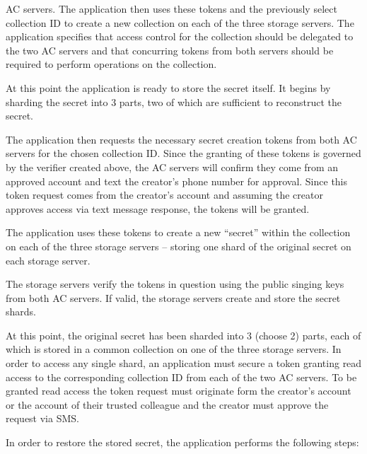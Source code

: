 \begin{packed_enum}
{    AC servers}. The application then uses these tokens and the
  previously select collection ID to create a new collection on each
  of the three storage servers. The application specifies that access
  control for the collection should be delegated to the two AC servers
  and that concurring tokens from both servers should be required to
  perform operations on the collection.
\item At this point the application is ready to store the secret
  itself. It begins by sharding the secret into 3 parts, two of which
  are sufficient to reconstruct the secret.
\item The application then requests the necessary secret creation
  tokens from both AC servers for the chosen collection ID. Since the
  granting of these tokens is governed by the verifier created above,
  the AC servers will confirm they come from an approved account and
  text the creator's phone number for approval. Since this token
  request comes from the creator's account and assuming the creator
  approves access via text message response, the tokens will be
  granted.
\item The application uses these tokens to create a new ``secret''
  within the collection on each of the three storage servers --
  storing one shard of the original secret on each storage server.
\item The storage servers verify the tokens in question using the
  public singing keys from both AC servers. If valid, the storage
  servers create and store the secret shards.
\end{packed_enum}

At this point, the original secret has been sharded into 3 (choose 2)
parts, each of which is stored in a common collection on one of the
three storage servers. In order to access any single shard, an
application must secure a token granting read access to the
corresponding collection ID from each of the two AC servers. To be
granted read access the token request must originate form the
creator's account or the account of their trusted colleague and the
creator must approve the request via SMS.

In order to restore the stored secret, the application performs the
following steps:


